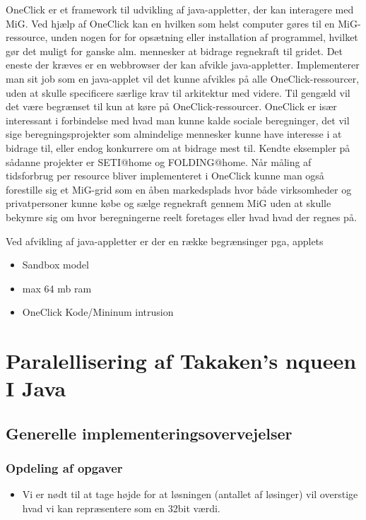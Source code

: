 \documentclass[final,a4paper,10pt]{article}
\begin{document}
OneClick er et framework til udvikling af java-appletter, der kan interagere med MiG. Ved hjælp af OneClick kan en hvilken som helst computer gøres til en MiG-ressource, unden nogen for for opsætning eller installation af programmel, hvilket gør det muligt for ganske alm. mennesker at bidrage regnekraft til gridet. Det eneste der kræves er en webbrowser der kan afvikle java-appletter. Implementerer man sit job som en java-applet vil det kunne afvikles på alle OneClick-ressourcer, uden at skulle specificere særlige krav til arkitektur med videre. Til gengæld vil det være begrænset til kun at køre på OneClick-ressourcer. 
OneClick er især interessant i forbindelse med hvad man kunne kalde sociale beregninger, det vil sige beregningsprojekter som almindelige mennesker kunne have interesse i at bidrage til, eller endog konkurrere om at bidrage mest til. Kendte eksempler på sådanne projekter er SETI@home og FOLDING@home. Når måling af tidsforbrug per resource bliver implementeret i OneClick kunne man også  forestille sig et MiG-grid som en åben markedsplads hvor både virksomheder og privatpersoner kunne købe og sælge regnekraft gennem MiG uden at skulle bekymre sig om hvor beregningerne reelt foretages eller hvad hvad der regnes på.  

Ved afvikling af java-appletter er der en række begrænsinger pga, applets
\begin{itemize}
	
	\item Sandbox model
	\item max 64 mb ram
	\item OneClick Kode/Mininum intrusion
\end{itemize}

\section{Paralellisering af Takaken's nqueen I Java}

\subsection{Generelle implementeringsovervejelser}
\subsubsection{Opdeling af opgaver}

\begin{itemize}
\item{Vi er nødt til at tage højde for at løsningen (antallet af løsinger) vil overstige hvad vi kan repræsentere som en 32bit værdi. }
\end{itemize}
\end{document}
